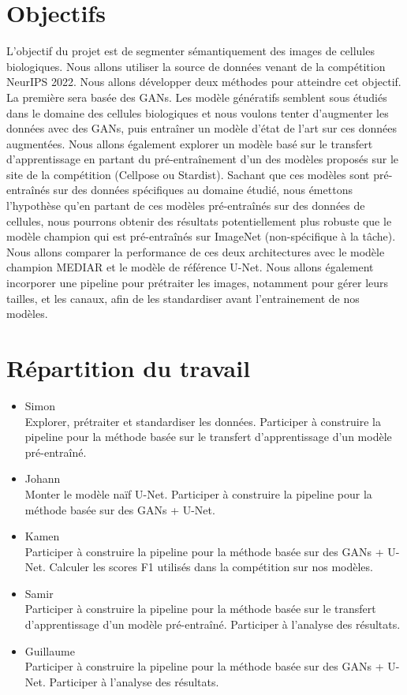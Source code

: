 \documentclass{article}
\begin{document}
\section{Objectifs}
L'objectif du projet est de segmenter sémantiquement des images de cellules biologiques. Nous allons utiliser la source de données venant de la compétition NeurIPS 2022. Nous allons développer deux méthodes pour atteindre cet objectif. La première sera basée des GANs. Les modèle génératifs semblent sous étudiés dans le domaine des cellules biologiques et nous voulons tenter d'augmenter les données avec des GANs, puis entraîner un modèle d'état de l'art sur ces données augmentées. Nous allons également explorer un modèle basé sur le transfert d'apprentissage en partant du pré-entraînement d'un des modèles proposés sur le site de la compétition (Cellpose ou Stardist). Sachant que ces modèles sont pré-entraînés sur des données spécifiques au domaine étudié, nous émettons l'hypothèse qu'en partant de ces modèles pré-entraînés sur des données de cellules, nous pourrons obtenir des résultats potentiellement plus robuste que le modèle champion qui est pré-entraînés sur ImageNet (non-spécifique à la tâche). Nous allons comparer la performance de ces deux architectures avec le modèle champion MEDIAR et le modèle de référence U-Net. Nous allons également incorporer une pipeline pour prétraiter les images, notamment pour gérer leurs tailles, et les canaux, afin de les standardiser avant l'entrainement de nos modèles. 

\newpage
\section{Répartition du travail}
\begin{itemize}
    \item Simon \\
    Explorer, prétraiter et standardiser les données. Participer à construire la pipeline pour la méthode basée sur le transfert d'apprentissage d'un modèle pré-entraîné.
    \item Johann \\
    Monter le modèle naïf U-Net. Participer à construire la pipeline pour la méthode basée sur des GANs + U-Net.
    \item Kamen \\
    Participer à construire la pipeline pour la méthode basée sur des GANs + U-Net. Calculer les scores F1 utilisés dans la compétition sur nos modèles.
    \item Samir \\
    Participer à construire la pipeline pour la méthode basée sur le transfert d'apprentissage d'un modèle pré-entraîné. Participer à l'analyse des résultats. 
    \item Guillaume \\
    Participer à construire la pipeline pour la méthode basée sur des GANs + U-Net. Participer à l'analyse des résultats.
\end{itemize}
\end{document}
